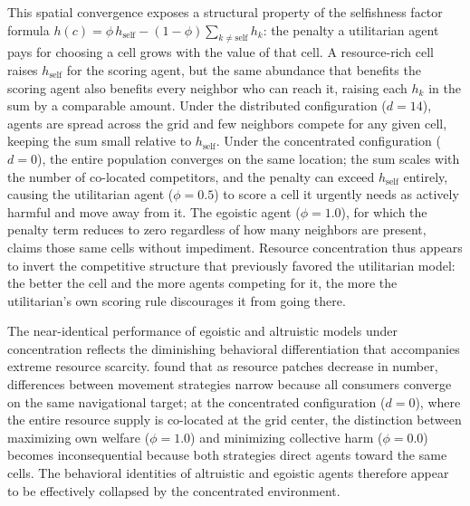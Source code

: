 \documentclass{icsthesis}
\begin{document}
\begin{mainmatter}
This spatial convergence exposes a structural property of the selfishness factor formula $h(c) = \phi\, h_{\text{self}} - (1-\phi)\sum_{k \neq \text{self}} h_k$: the penalty a utilitarian agent pays for choosing a cell grows with the value of that cell. A resource-rich cell raises $h_{\text{self}}$ for the scoring agent, but the same abundance that benefits the scoring agent also benefits every neighbor who can reach it, raising each $h_k$ in the sum by a comparable amount. Under the distributed configuration ($d = 14$), agents are spread across the grid and few neighbors compete for any given cell, keeping the sum small relative to $h_{\text{self}}$. Under the concentrated configuration ($d = 0$), the entire population converges on the same location; the sum scales with the number of co-located competitors, and the penalty can exceed $h_{\text{self}}$ entirely, causing the utilitarian agent ($\phi = 0.5$) to score a cell it urgently needs as actively harmful and move away from it. The egoistic agent ($\phi = 1.0$), for which the penalty term reduces to zero regardless of how many neighbors are present, claims those same cells without impediment. Resource concentration thus appears to invert the competitive structure that previously favored the utilitarian model: the better the cell and the more agents competing for it, the more the utilitarian's own scoring rule discourages it from going there.

The near-identical performance of egoistic and altruistic models under concentration reflects the diminishing behavioral differentiation that accompanies extreme resource scarcity. \citet{Fagan2022} found that as resource patches decrease in number, differences between movement strategies narrow because all consumers converge on the same navigational target; at the concentrated configuration ($d = 0$), where the entire resource supply is co-located at the grid center, the distinction between maximizing own welfare ($\phi = 1.0$) and minimizing collective harm ($\phi = 0.0$) becomes inconsequential because both strategies direct agents toward the same cells. The behavioral identities of altruistic and egoistic agents therefore appear to be effectively collapsed by the concentrated environment.


\end{mainmatter}
\end{document}

